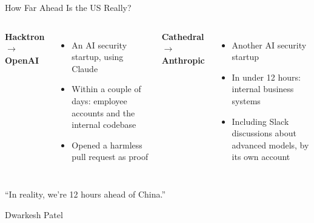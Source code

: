 \begin{frame}{How Far Ahead Is the US Really?}
\begin{columns}[t]
\textbf{Hacktron $\to$ OpenAI}
\begin{itemize}
\item An AI security startup, using Claude
\item Within a couple of days: employee accounts and the internal codebase
\item Opened a harmless pull request as proof
\end{itemize}
\textbf{Cathedral $\to$ Anthropic}
\begin{itemize}
\item Another AI security startup
\item In under 12 hours: internal business systems
\item Including Slack discussions about advanced models, by its own account
\end{itemize}
\end{columns}
\vspace{0.6em}
\pause
\centering
{\large ``In reality, we're 12 hours ahead of China.''}

{\small Dwarkesh Patel}
\end{frame}
